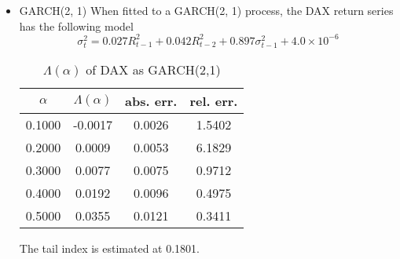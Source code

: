 \documentclass{article}
\theoremstyle{remark}
\begin{document}
\begin{itemize}
\item GARCH(2, 1)
  When fitted to a GARCH(2, 1) process, the DAX return series has the following model
  \[
  \sigma_t^2 = 0.027 R_{t-1}^2 + 0.042 R_{t-2}^2 + 0.897 \sigma_{t-1}^2 + 4.0 \times 10^{-6}
  \]
  \begin{table}[htb!]
    \centering
    \begin{tabular}{c|c|c|c}
      $\alpha$ & $\Lambda(\alpha)$ & abs. err. & rel. err. \\
      \hline
      0.1000 & -0.0017 & 0.0026 & 1.5402 \\
      0.2000 &  0.0009 & 0.0053 & 6.1829 \\
      0.3000 &  0.0077 & 0.0075 & 0.9712 \\
      0.4000 &  0.0192 & 0.0096 & 0.4975 \\
      0.5000 &  0.0355 & 0.0121 & 0.3411 \\
    \end{tabular}
    \caption{$\Lambda(\alpha)$ of DAX as GARCH(2,1)}
    \label{tab:DAX_garch21_Lambda}
  \end{table}
  The tail index is estimated at 0.1801.
\end{itemize}

\end{document}
